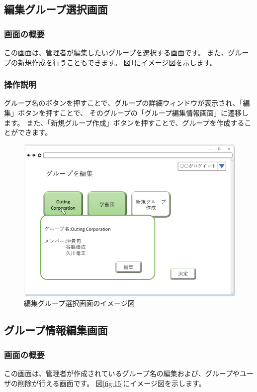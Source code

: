 \newpage

\subsection{編集グループ選択画面}
\subsubsection{画面の概要}
この画面は、管理者が編集したいグループを選択する画面です。
また、グループの新規作成を行うこともできます。
図\ref{fig:14}にイメージ図を示します。

\subsubsection{操作説明}
グループ名のボタンを押すことで、グループの詳細ウィンドウが表示され、「編集」ボタンを押すことで、
そのグループの「グループ編集情報画面」に遷移します。
また、「新規グループ作成」ボタンを押すことで、グループを作成することができます。

\begin{figure}[htbp]
  \begin{center}
    \includegraphics[width=0.7\linewidth,clip]{./img/14.png}
    \caption{編集グループ選択画面のイメージ図}\label{fig:14}
  \end{center}
\end{figure}

\newpage

\subsection{グループ情報編集画面}
\subsubsection{画面の概要}
この画面は、管理者が作成されているグループ名の編集および、グループやユーザの削除が行える画面です。
図\ref{fig:15}にイメージ図を示します。

